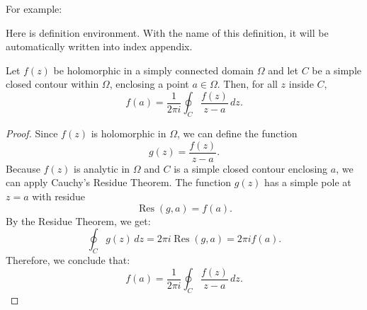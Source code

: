        For example:
        \begin{definition}
            Here is definition environment. With the name of this definition, it will be automatically written into index appendix.
        \end{definition}
        \lipsum[1-3]
        \begin{theorem}
            Let $f(z)$ be holomorphic in a simply connected domain $\Omega$ and let $C$ be a simple closed contour within $\Omega$, enclosing a point $a \in \Omega$. Then, for all $z$ inside $C$,
            \[
            f(a) = \frac{1}{2\pi i} \oint_C \frac{f(z)}{z-a} \, dz.
            \]
        \end{theorem}
        \begin{proof}
            Since $f(z)$ is holomorphic in $\Omega$, we can define the function
            \[
            g(z) = \frac{f(z)}{z-a}.
            \]
            Because $f(z)$ is analytic in $\Omega$ and $C$ is a simple closed contour enclosing $a$, we can apply Cauchy's Residue Theorem. The function $g(z)$ has a simple pole at $z=a$ with residue
            \[
            \operatorname{Res}(g, a) = f(a).
            \]
            By the Residue Theorem, we get:
            \[
            \oint_C g(z) \, dz = 2\pi i \operatorname{Res}(g, a) = 2\pi i f(a).
            \]
            Therefore, we conclude that:
            \[
            f(a) = \frac{1}{2\pi i} \oint_C \frac{f(z)}{z-a} \, dz.
            \]
        \end{proof}
        \lipsum[12-16]